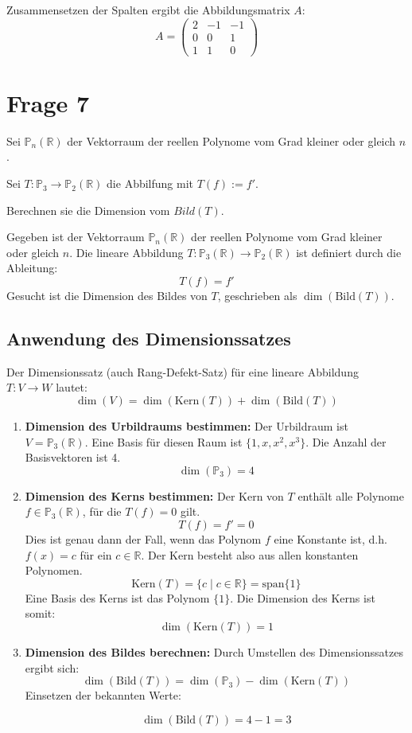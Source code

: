 Zusammensetzen der Spalten ergibt die Abbildungsmatrix \(A\):
\[
A = \begin{pmatrix} 2 & -1 & -1 \\ 0 & 0 & 1 \\ 1 & 1 & 0 \end{pmatrix}
\]

\section{Frage 7} 

Sei $\mathbb{P}_n(\mathbb{R})$ der Vektorraum der reellen Polynome vom Grad kleiner oder gleich $n$.

Sei $T : \mathbb{P}_3 \rightarrow \mathbb{P}_2(\mathbb{R})$ die Abbilfung mit $T(f) := f'$.

Berechnen sie die Dimension vom $Bild(T)$.

Gegeben ist der Vektorraum $\mathbb{P}_n(\mathbb{R})$ der reellen Polynome vom Grad kleiner oder gleich $n$.
Die lineare Abbildung $T: \mathbb{P}_3(\mathbb{R}) \to \mathbb{P}_2(\mathbb{R})$ ist definiert durch die Ableitung:
\[ T(f) = f' \]
Gesucht ist die Dimension des Bildes von $T$, geschrieben als $\dim(\text{Bild}(T))$.

\subsection*{Anwendung des Dimensionssatzes}
Der Dimensionssatz (auch Rang-Defekt-Satz) für eine lineare Abbildung $T: V \to W$ lautet:
\[ \dim(V) = \dim(\text{Kern}(T)) + \dim(\text{Bild}(T)) \]

\begin{enumerate}
    \item \textbf{Dimension des Urbildraums bestimmen:}
    Der Urbildraum ist $V = \mathbb{P}_3(\mathbb{R})$. Eine Basis für diesen Raum ist $\{1, x, x^2, x^3\}$. Die Anzahl der Basisvektoren ist 4.
    \[ \dim(\mathbb{P}_3) = 4 \]

    \item \textbf{Dimension des Kerns bestimmen:}
    Der Kern von $T$ enthält alle Polynome $f \in \mathbb{P}_3(\mathbb{R})$, für die $T(f) = 0$ gilt.
    \[ T(f) = f' = 0 \]
    Dies ist genau dann der Fall, wenn das Polynom $f$ eine Konstante ist, d.h. $f(x) = c$ für ein $c \in \mathbb{R}$. Der Kern besteht also aus allen konstanten Polynomen.
    \[ \text{Kern}(T) = \{c \mid c \in \mathbb{R}\} = \text{span}\{1\} \]
    Eine Basis des Kerns ist das Polynom $\{1\}$. Die Dimension des Kerns ist somit:
    \[ \dim(\text{Kern}(T)) = 1 \]

    \item \textbf{Dimension des Bildes berechnen:}
    Durch Umstellen des Dimensionssatzes ergibt sich:
    \[ \dim(\text{Bild}(T)) = \dim(\mathbb{P}_3) - \dim(\text{Kern}(T)) \]
    Einsetzen der bekannten Werte:
    
    \[ \dim(\text{Bild}(T)) = 4 - 1 = 3 \]
\end{enumerate}

